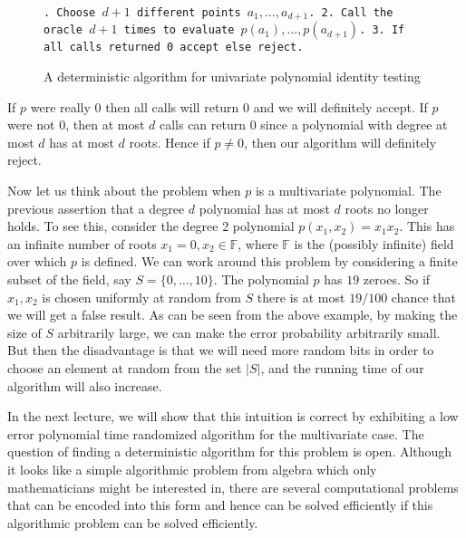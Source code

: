 \begin{figure}[ht]
{\tt \obeyspaces {}. Choose $d + 1$ different points $a_1 , \ldots , a_{d+1}$.
2. Call the oracle $d+1$ times to evaluate $p(a_1), \ldots , p(a_{d+1})$.
3. If all calls returned 0 accept else reject.
}
\caption{A deterministic algorithm for univariate polynomial identity testing}
\end{figure}

If $p$ were really 0 then all calls will return 0 and we will definitely accept. If $p$ were not 
0, then at most $d$ calls can return 0 since a polynomial with degree at most $d$ has at most $d$ 
roots. Hence if $p \neq 0$, then our algorithm will definitely reject.

Now let us think about the problem when $p$ is a multivariate
polynomial. The previous assertion that a degree $d$ polynomial has at
most $d$ roots no longer holds. To see this, consider the degree 2
polynomial $p(x_1, x_2) = x_1 x_2$. This has an infinite number of
roots $x_1 = 0, x_2 \in \mathbb{F}$, where $\mathbb{F}$ is the
(possibly infinite) field over which $p$ is defined.  We can work
around this problem by considering a finite subset of the field, say
$S = \{ 0, \ldots ,10 \}$. The polynomial $p$ has $19$ zeroes. So if
$x_1, x_2$ is chosen uniformly at random from $S$ there is at most
$19/100$ chance that we will get a false result. As can be seen from
the above example, by making the size of $S$ arbitrarily large, we can
make the error probability arbitrarily small. But then the
disadvantage is that we will need more random bits in order to choose
an element at random from the set $|S|$, and the running time of our
algorithm will also increase.

In the next lecture, we will show that this intuition is correct by
exhibiting a low error polynomial time randomized algorithm for the
multivariate case. The question of finding a deterministic algorithm
for this problem is open. Although it looks like a simple algorithmic
problem from algebra which only mathematicians might be interested in,
there are several computational problems that can be encoded into this
form and hence can be solved efficiently if this algorithmic problem
can be solved efficiently.
 
